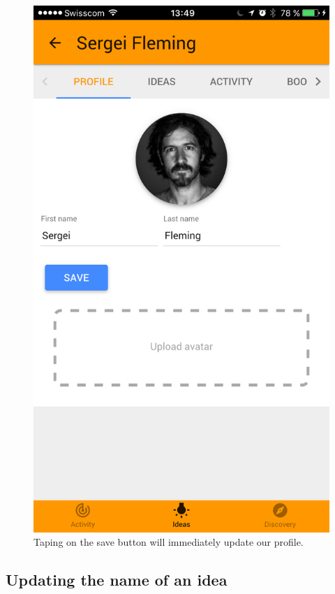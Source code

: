 \documentclass[a4paper,12pt,twoside]{article}
\begin{document}
\begin{figure}[!htb]
\begin{minipage}[t]{.32\textwidth}
    \end{minipage}
    \hfill
    \begin{minipage}[t]{.32\textwidth}
        \centering
        \includegraphics[width=\textwidth]{images/flow_completingProfile_3.png}
        \caption{Taping on the save button will immediately update our profile.}
    \end{minipage}
\end{figure}

\clearpage
\subsection{Updating the name of an idea}
\end{document}
